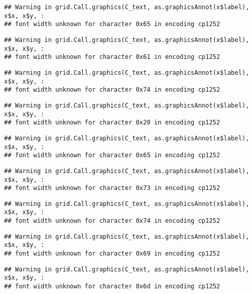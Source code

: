 \documentclass[
]{article}
\begin{document}
\begin{verbatim}
## Warning in grid.Call.graphics(C_text, as.graphicsAnnot(x$label), x$x, x$y, :
## font width unknown for character 0x65 in encoding cp1252
\end{verbatim}

\begin{verbatim}
## Warning in grid.Call.graphics(C_text, as.graphicsAnnot(x$label), x$x, x$y, :
## font width unknown for character 0x61 in encoding cp1252
\end{verbatim}

\begin{verbatim}
## Warning in grid.Call.graphics(C_text, as.graphicsAnnot(x$label), x$x, x$y, :
## font width unknown for character 0x74 in encoding cp1252
\end{verbatim}

\begin{verbatim}
## Warning in grid.Call.graphics(C_text, as.graphicsAnnot(x$label), x$x, x$y, :
## font width unknown for character 0x20 in encoding cp1252
\end{verbatim}

\begin{verbatim}
## Warning in grid.Call.graphics(C_text, as.graphicsAnnot(x$label), x$x, x$y, :
## font width unknown for character 0x65 in encoding cp1252
\end{verbatim}

\begin{verbatim}
## Warning in grid.Call.graphics(C_text, as.graphicsAnnot(x$label), x$x, x$y, :
## font width unknown for character 0x73 in encoding cp1252
\end{verbatim}

\begin{verbatim}
## Warning in grid.Call.graphics(C_text, as.graphicsAnnot(x$label), x$x, x$y, :
## font width unknown for character 0x74 in encoding cp1252
\end{verbatim}

\begin{verbatim}
## Warning in grid.Call.graphics(C_text, as.graphicsAnnot(x$label), x$x, x$y, :
## font width unknown for character 0x69 in encoding cp1252
\end{verbatim}

\begin{verbatim}
## Warning in grid.Call.graphics(C_text, as.graphicsAnnot(x$label), x$x, x$y, :
## font width unknown for character 0x6d in encoding cp1252
\end{verbatim}
\end{document}
